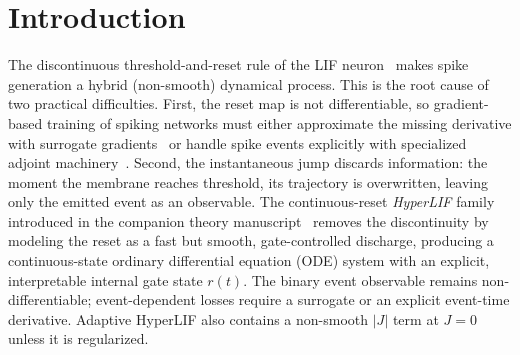 \documentclass[11pt]{article}
\newcommand{\thetaevent}{\theta_{\mathrm{event}}}
\newcommand{\code}[1]{\texttt{#1}}
\begin{document}
\begin{abstract}
selection)---run with HyperLIF as a drop-in \code{NeuronType}; its one weakness
is online-learning speed, which we show is a tunable firing-rate trade with a
$\sim\!40$ Hz sweet spot. A five-seed scalar NEF state-readout ablation then
shows that the probeable reset gate and combined state features can decode the
represented signal at low firing rates. A static $\thetaevent=0.95$ raises the
peak settled event rate from $151.14$ to $217.83$ Hz without changing the
continuous gate/reset dynamics. We further find a hard framework limit: a custom
continuous-gate neuron is confined to the reference NumPy simulator---the OpenCL
and Loihi backends reject it and NengoDL is version-locked---so accelerated or
neuromorphic deployment would require per-backend kernels or a fixed-hardware
neuron mapping. Finally, we interpret the continuous reset gate as a decodable
readiness-to-fire signal, an explicitly future-work bridge to gate-state residual
decoding for control. All figures, tables, and claims are reproducible from the
included code and data.
\end{abstract}

\section{Introduction}\label{sec:intro}
The discontinuous threshold-and-reset rule of the LIF
neuron~\cite{lapicque1907} makes spike generation a hybrid (non-smooth)
dynamical process. This is the root cause of two practical difficulties. First,
the reset map is not differentiable, so gradient-based training of spiking
networks must either approximate the missing derivative with surrogate
gradients~\cite{neftci2019surrogate} or handle spike events explicitly with
specialized adjoint machinery~\cite{wunderlich2021eventprop}. Second, the
instantaneous jump discards information: the moment the membrane reaches
threshold, its trajectory is overwritten, leaving only the emitted event as an
observable. The continuous-reset \emph{HyperLIF} family introduced in the
companion theory manuscript~\cite{hyperlif_theory} removes the discontinuity by
modeling the reset as a fast but smooth, gate-controlled discharge, producing a
continuous-state ordinary differential equation (ODE) system with an explicit,
interpretable internal gate state $r(t)$. The binary event observable remains
non-differentiable; event-dependent losses require a surrogate or an explicit
event-time derivative. Adaptive HyperLIF also contains a non-smooth $|J|$ term
at $J=0$ unless it is regularized.
\end{document}
